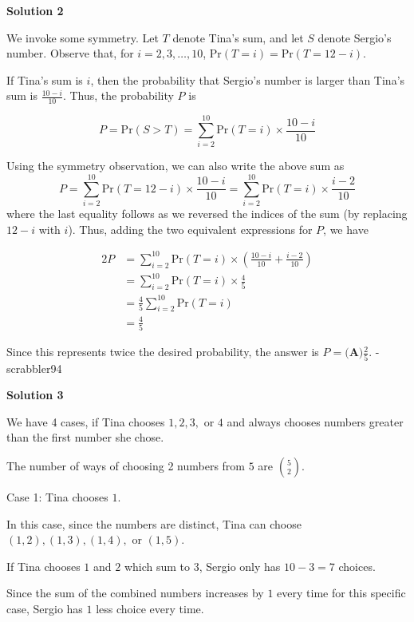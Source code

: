 \begin{enumerate}
 



\textbf{Solution 2}

We invoke some symmetry. Let $T$ denote Tina's sum, and let $S$ denote Sergio's number. Observe that, for $i = 2, 3, \ldots, 10$, $\text{Pr}(T=i) = \text{Pr}(T=12-i)$.

 If Tina's sum is $i$, then the probability that Sergio's number is larger than Tina's sum is $\frac{10-i}{10}$. Thus, the probability $P$ is

 
 \[P = \text{Pr}(S>T) = \sum_{i=2}^{10} \text{Pr}(T=i) \times \frac{10-i}{10}\]

 Using the symmetry observation, we can also write the above sum as
 \[P = \sum_{i=2}^{10} \text{Pr}(T=12-i) \times \frac{10-i}{10} = \sum_{i=2}^{10} \text{Pr}(T=i) \times \frac{i-2}{10}\]where the last equality follows as we reversed the indices of the sum (by replacing $12-i$ with $i$). Thus, adding the two equivalent expressions for $P$, we have

 
 \begin{align*} 2P &= \sum_{i=2}^{10} \text{Pr}(T=i) \times \left(\frac{10-i}{10} + \frac{i-2}{10}\right) \\ &= \sum_{i=2}^{10} \text{Pr}(T=i) \times \frac{4}{5} \\ &= \frac{4}{5} \sum_{i=2}^{10} \text{Pr}(T=i) \\ &= \frac{4}{5} \end{align*}


 Since this represents twice the desired probability, the answer is $P = \boxed{\textbf{(A)} \frac{2}{5}}$. -scrabbler94

 



\textbf{Solution 3}

We have 4 cases, if Tina chooses $1, 2, 3,$ or  $4$ and always chooses numbers greater than the first number she chose.

 The number of ways of choosing 2 numbers from $5$ are $\binom{5}{2}$.

 Case 1: Tina chooses $1$.

 In this case, since the numbers are distinct, Tina can choose $(1, 2), (1, 3), (1, 4),$ or $(1, 5).$

 If Tina chooses $1$ and $2$ which sum to $3$, Sergio only has $10-3=7$ choices.

 Since the sum of the combined numbers increases by $1$ every time for this specific case, Sergio has $1$ less choice every time.


\end{enumerate}
